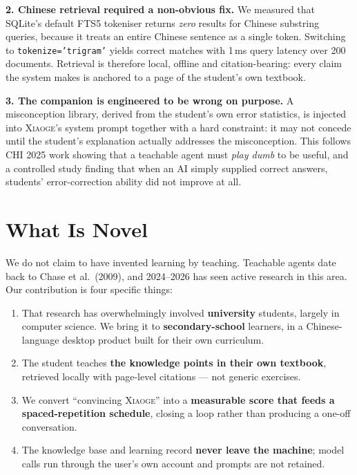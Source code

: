 \documentclass[10pt,a4paper]{article}
\newcommand{\xiaoge}{\textsc{Xiaoge}}
\begin{document}
\textbf{2. Chinese retrieval required a non-obvious fix.} We measured that SQLite's default
FTS5 tokeniser returns \emph{zero} results for Chinese substring queries, because it treats
an entire Chinese sentence as a single token. Switching to \texttt{tokenize='trigram'}
yields correct matches with 1\,ms query latency over 200 documents. Retrieval is therefore
local, offline and citation-bearing: every claim the system makes is anchored to a page of
the student's own textbook.

\textbf{3. The companion is engineered to be wrong on purpose.} A misconception library,
derived from the student's own error statistics, is injected into \xiaoge{}'s system prompt
together with a hard constraint: it may not concede until the student's explanation actually
addresses the misconception. This follows CHI 2025 work showing that a teachable agent must
\emph{play dumb} to be useful, and a controlled study finding that when an AI simply
supplied correct answers, students' error-correction ability did not improve at all.

\section{What Is Novel}

We do not claim to have invented learning by teaching. Teachable agents date back to Chase
et al.\ (2009), and 2024--2026 has seen active research in this area. Our contribution is
four specific things:

\begin{enumerate}[leftmargin=1.4em,itemsep=1pt,topsep=2pt]
  \item That research has overwhelmingly involved \textbf{university} students, largely in
  computer science. We bring it to \textbf{secondary-school} learners, in a
  Chinese-language desktop product built for their own curriculum.
  \item The student teaches \textbf{the knowledge points in their own textbook}, retrieved
  locally with page-level citations --- not generic exercises.
  \item We convert ``convincing \xiaoge{}'' into a \textbf{measurable score that feeds a
  spaced-repetition schedule}, closing a loop rather than producing a one-off conversation.
  \item The knowledge base and learning record \textbf{never leave the machine}; model calls
  run through the user's own account and prompts are not retained.
\end{enumerate}
\end{document}
